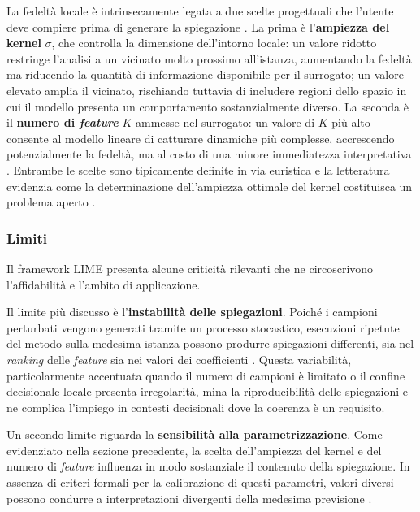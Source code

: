 La fedeltà locale è intrinsecamente legata a due scelte progettuali che l'utente deve compiere prima di generare la spiegazione \cite{molnar2025interpretable}. La prima è l'\textbf{ampiezza del kernel} $\sigma$, che controlla la dimensione dell'intorno locale: un valore ridotto restringe l'analisi a un vicinato molto prossimo all'istanza, aumentando la fedeltà ma riducendo la quantità di informazione disponibile per il surrogato; un valore elevato amplia il vicinato, rischiando tuttavia di includere regioni dello spazio in cui il modello presenta un comportamento sostanzialmente diverso. La seconda è il \textbf{numero di \textit{feature}} $K$ ammesse nel surrogato: un valore di $K$ più alto consente al modello lineare di catturare dinamiche più complesse, accrescendo potenzialmente la fedeltà, ma al costo di una minore immediatezza interpretativa \cite{molnar2025interpretable}. Entrambe le scelte sono tipicamente definite in via euristica e la letteratura evidenzia come la determinazione dell'ampiezza ottimale del kernel costituisca un problema aperto \cite{molnar2025interpretable}.

\subsubsection{Limiti}

Il framework LIME presenta alcune criticità rilevanti che ne circoscrivono l'affidabilità e l'ambito di applicazione.

Il limite più discusso è l'\textbf{instabilità delle spiegazioni}. Poiché i campioni perturbati vengono generati tramite un processo stocastico, esecuzioni ripetute del metodo sulla medesima istanza possono produrre spiegazioni differenti, sia nel \textit{ranking} delle \textit{feature} sia nei valori dei coefficienti \cite{molnar2025interpretable}. Questa variabilità, particolarmente accentuata quando il numero di campioni è limitato o il confine decisionale locale presenta irregolarità, mina la riproducibilità delle spiegazioni e ne complica l'impiego in contesti decisionali dove la coerenza è un requisito.

Un secondo limite riguarda la \textbf{sensibilità alla parametrizzazione}. Come evidenziato nella sezione precedente, la scelta dell'ampiezza del kernel e del numero di \textit{feature} influenza in modo sostanziale il contenuto della spiegazione. In assenza di criteri formali per la calibrazione di questi parametri, valori diversi possono condurre a interpretazioni divergenti della medesima previsione \cite{molnar2025interpretable}.

